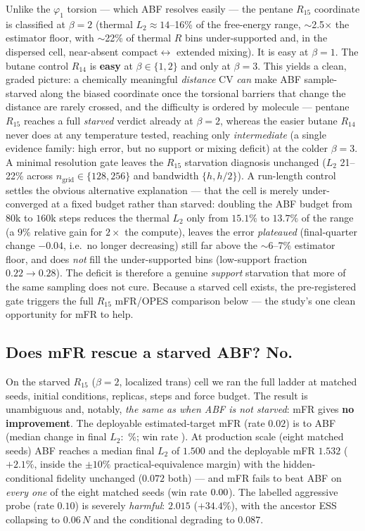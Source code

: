 Unlike the $\varphi_1$ torsion --- which ABF resolves easily --- the pentane $R_{15}$
coordinate is classified \textbf{\CvRfifteenStarv} at $\beta=2$ (thermal $L_2\approx14$--16\%
of the free-energy range, $\sim$2.5$\times$ the estimator floor, with $\sim$22\% of thermal
$R$ bins under-supported and, in the dispersed cell, near-absent compact$\leftrightarrow$
extended mixing). It is easy at $\beta=1$. The butane control $R_{14}$ is \textbf{easy} at
$\beta\in\{1,2\}$ and only \textbf{\CvRfourteenStarv} at $\beta=3$. This yields a clean,
graded picture: a chemically meaningful \emph{distance} CV \emph{can} make ABF sample-starved
along the biased coordinate once the torsional barriers that change the distance are rarely
crossed, and the difficulty is ordered by molecule --- pentane $R_{15}$ reaches a full
\emph{starved} verdict already at $\beta=2$, whereas the easier butane $R_{14}$ never does at
any temperature tested, reaching only \emph{intermediate} (a single evidence family: high
error, but no support or mixing deficit) at the colder $\beta=3$. A minimal resolution gate leaves the
$R_{15}$ starvation diagnosis unchanged ($L_2$ 21--22\% across $n_\mathrm{grid}\in\{128,256\}$
and bandwidth $\{h,h/2\}$). A run-length control settles the obvious alternative explanation
--- that the cell is merely under-converged at a fixed budget rather than starved: doubling
the ABF budget from $80$k to $160$k steps reduces the thermal $L_2$ only from $15.1\%$ to
$13.7\%$ of the range (a $9\%$ relative gain for $2\times$ the compute), leaves the error
\emph{plateaued} (final-quarter change $-0.04$, i.e.\ no longer decreasing) still far above the
$\sim$6--7\% estimator floor, and does \emph{not} fill the under-supported bins (low-support
fraction $0.22\to0.28$). The deficit is therefore a genuine \emph{support} starvation that more
of the same sampling does not cure.
Because a starved cell exists, the pre-registered gate triggers the full $R_{15}$ mFR/OPES
comparison below --- the study's one clean opportunity for mFR to help.


\subsection{Does mFR rescue a starved ABF? No.}
On the starved $R_{15}$ ($\beta=2$, localized trans) cell we ran the full ladder at matched
seeds, initial conditions, replicas, steps and force budget. The result is unambiguous and,
notably, \emph{the same as when ABF is not starved}: mFR gives \textbf{no improvement}. The
deployable estimated-target mFR (rate $0.02$) is \textbf{\CvRfifteenmFRVerdict} to ABF
(median change in final $L_2$: \CvRfifteenmFRRelFinal\,\%; win rate \CvRfifteenmFRWin). At
production scale (eight matched seeds) ABF reaches a median final $L_2$ of $1.500$ and the
deployable mFR $1.532$ ($+2.1\%$, inside the $\pm10\%$ practical-equivalence margin) with the
hidden-conditional fidelity unchanged ($0.072$ both) --- and mFR fails to beat ABF on
\emph{every one} of the eight matched seeds (win rate $0.00$). The labelled
aggressive probe (rate $0.10$) is severely \emph{harmful}: $2.015$ ($+34.4\%$), with the
ancestor ESS collapsing to $0.06\,N$ and the conditional degrading to $0.087$.


